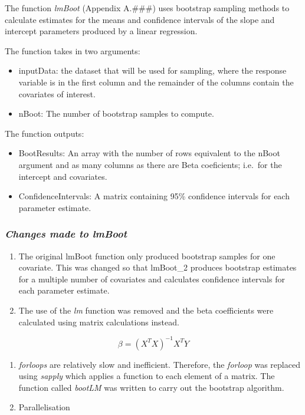 \documentclass[]{article}
\providecommand{\tightlist}{%
  \setlength{\itemsep}{0pt}\setlength{\parskip}{0pt}}
\begin{document}
The function \emph{lmBoot} (Appendix A.\#\#\#) uses bootstrap sampling
methods to calculate estimates for the means and confidence intervals of
the slope and intercept parameters produced by a linear regression.

The function takes in two arguments:

\begin{itemize}
\tightlist
\item
  inputData: the dataset that will be used for sampling, where the
  response variable is in the first column and the remainder of the
  columns contain the covariates of interest.
\item
  nBoot: The number of bootstrap samples to compute.
\end{itemize}

The function outputs:

\begin{itemize}
\tightlist
\item
  BootResults: An array with the number of rows equivalent to the nBoot
  argument and as many columns as there are Beta coeficients; i.e.~for
  the intercept and covariates.
\item
  ConfidenceIntervals: A matrix containing 95\% confidence intervals for
  each parameter estimate.
\end{itemize}

\subsubsection{\texorpdfstring{\emph{Changes made to
lmBoot}}{Changes made to lmBoot}}\label{changes-made-to-lmboot}

\begin{enumerate}
\def\labelenumi{\arabic{enumi}.}
\item
  The original lmBoot function only produced bootstrap samples for one
  covariate. This was changed so that lmBoot\_2 produces bootstrap
  estimates for a multiple number of covariates and calculates
  confidence intervals for each parameter estimate.
\item
  The use of the \emph{lm} function was removed and the beta
  coefficients were calculated using matrix calculations instead.
\end{enumerate}

\[
\beta = (X^TX)^{-1}X^TY
\]

\begin{enumerate}
\def\labelenumi{\arabic{enumi}.}
\setcounter{enumi}{2}
\item
  \emph{forloops} are relatively slow and inefficient. Therefore, the
  \emph{forloop} was replaced using \emph{sapply} which applies a
  function to each element of a matrix. The function called
  \emph{bootLM} was written to carry out the bootstrap algorithm.
\item
  Parallelisation
\end{enumerate}
\end{document}
